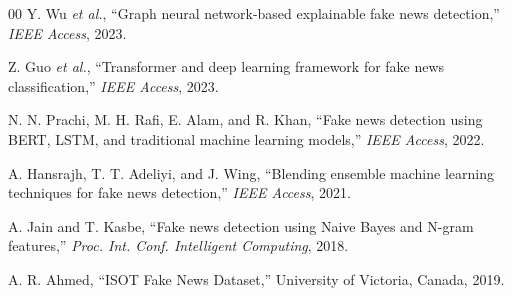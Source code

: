 \documentclass[conference]{IEEEtran}
\begin{document}
\begin{thebibliography}{00}
Y. Wu \textit{et al.}, “Graph neural network-based explainable fake news detection,” \textit{IEEE Access}, 2023.

Z. Guo \textit{et al.}, “Transformer and deep learning framework for fake news classification,” \textit{IEEE Access}, 2023.

N. N. Prachi, M. H. Rafi, E. Alam, and R. Khan, “Fake news detection using BERT, LSTM, and traditional machine learning models,” \textit{IEEE Access}, 2022.

A. Hansrajh, T. T. Adeliyi, and J. Wing, “Blending ensemble machine learning techniques for fake news detection,” \textit{IEEE Access}, 2021.

A. Jain and T. Kasbe, “Fake news detection using Naive Bayes and N-gram features,” \textit{Proc. Int. Conf. Intelligent Computing}, 2018.

A. R. Ahmed, “ISOT Fake News Dataset,” University of Victoria, Canada, 2019.

\end{thebibliography}
\end{document}
